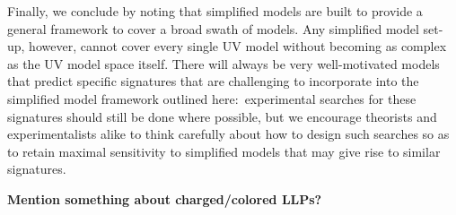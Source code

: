 Finally, we conclude by noting that simplified models are built to provide a general framework to cover a broad swath of models. Any simplified model set-up, however, cannot cover every single UV model without becoming as complex as the UV model space itself. There will always be very well-motivated models that predict specific signatures that are challenging to incorporate into the simplified model framework outlined here:~experimental searches for these signatures should still be done where possible, but we encourage theorists and experimentalists alike to think carefully about how to design such searches so as to retain maximal sensitivity to simplified models that may give rise to similar signatures.

{\bf Mention something about charged/colored LLPs?}


